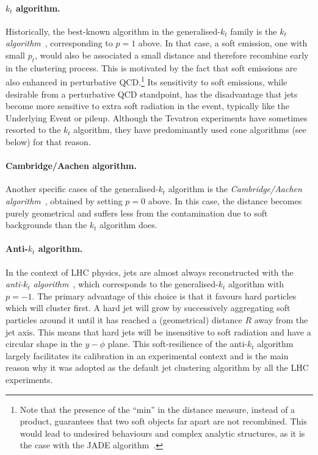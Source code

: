\paragraph{$k_t$ algorithm.}
%
Historically, the best-known algorithm in the generalised-$k_t$ family
is the {\em $k_t$ algorithm}~\cite{Catani:1993hr,Ellis:1993tq},
corresponding to $p=1$ above. In that case, a soft emission, \ie one
with small $p_t$, would also be associated a small distance and
therefore recombine early in the clustering process. This is
motivated by the fact that soft emissions are also enhanced in
perturbative QCD.\footnote{Note that the presence of the ``min'' in
  the distance measure, instead of a product, guarantees that two soft
  objects far apart are not recombined. This would lead to undesired
  behaviours and complex analytic structures, as it is the case with
  the JADE algorithm~\cite{Bartel:1986ua,Bethke:1988zc}.}
%
Its sensitivity to soft emissions, while desirable from a perturbative
QCD standpoint, has the disadvantage that jets become more sensitive
to extra soft radiation in the event, typically like the Underlying
Event or pileup.
%
Although the Tevatron experiments have sometimes resorted to the $k_t$
algorithm, they have predominantly used cone algorithms (see below)
for that reason.

\paragraph{Cambridge/Aachen algorithm.}
Another specific cases of the generalised-$k_t$ algorithm is the {\em
  Cambridge/Aachen algorithm}~\cite{Dokshitzer:1997in,Wobisch:1998wt},
obtained by setting $p=0$ above.
%
In this case, the distance becomes purely geometrical and suffers less
from the contamination due to soft backgrounds than the $k_t$
algorithm does.

\paragraph{Anti-$k_t$ algorithm.}
In the context of LHC physics, jets are almost always reconstructed
with the {\em anti-$k_t$ algorithm}~\cite{Cacciari:2008gp}, which
corresponds to the generalised-$k_t$ algorithm with $p=-1$. The
primary advantage of this choice is that it favours hard particles
which will cluster first.
%
A hard jet will grow by successively aggregating soft particles around
it until it has reached a (geometrical) distance $R$ away from the jet
axis. This means that hard jets will be insensitive to soft radiation
and have a circular shape in the $y-\phi$ plane.
% 
This soft-resilience of the anti-$k_t$ algorithm largely
facilitates its calibration in an experimental context and is the main
reason why it was adopted as the default jet clustering algorithm by
all the LHC experiments.

